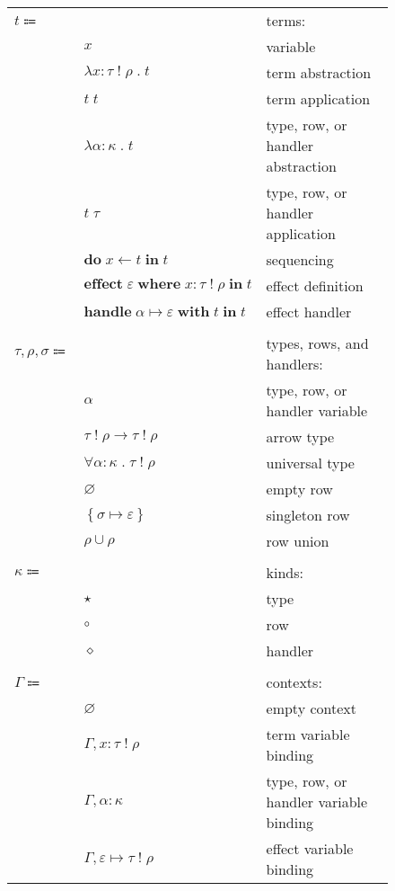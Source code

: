\documentclass[12pt]{article}
\newcommand\kAnno[2]{#1 : #2}
\newcommand\tAnno[3]{#1 : \tEmbellished{#2}{#3}}
\newcommand\xVar{\varepsilon}
\newcommand\hToX[2]{#1 \mapsto #2}
\newcommand\term{t}
\newcommand\eVar{x}
\newcommand\eAbs[4]{\lambda \tAnno{#1}{#2}{#3} \; . \; #4}
\newcommand\eApp[2]{#1 \; #2}
\newcommand\eTAbs[3]{\lambda \kAnno{#1}{#2} \; . \; #3}
\newcommand\eTApp[2]{#1 \; #2}
\newcommand\eDo[3]{\textbf{do} \; #1 \leftarrow #2 \; \textbf{in} \; #3}
\newcommand\eEffect[5]{\textbf{effect} \; #1 \; \textbf{where} \; \tAnno{#2}{#3}{#4} \; \textbf{in} \; #5}
\newcommand\eHandle[4]{\textbf{handle} \; \hToX{#1}{#2} \; \textbf{with} \; #3 \; \textbf{in} \; #4}
\newcommand\type{\tau}
\newcommand\tVar{\alpha}
\newcommand\tArrow[4]{\tEmbellished{#1}{#2} \rightarrow \tEmbellished{#3}{#4}}
\newcommand\tForAll[4]{\forall \kAnno{#1}{#2} \; . \; \tEmbellished{#3}{#4}}
\newcommand\row{\rho}
\newcommand\tEmbellished[2]{#1 \; ! \; #2}
\newcommand\tEmpty{\varnothing}
\newcommand\tSingleton[2]{\left\{ \hToX{#1}{#2} \right\}}
\newcommand\tUnion[2]{#1 \cup #2}
\newcommand\handler{\sigma}
\newcommand\kind{\kappa}
\newcommand\kType{\star}
\newcommand\kRow{\circ}
\newcommand\kHandler{\diamond}
\newcommand\context{\Gamma}
\newcommand\cEmpty{\varnothing}
\newcommand\cEExtend[4]{#1, \tAnno{#2}{#3}{#4}}
\newcommand\cTExtend[3]{#1, \kAnno{#2}{#3}}
\newcommand\cXExtend[4]{#1, #2 \mapsto \tEmbellished{#3}{#4}}
\begin{document}
      \begin{figure}[H]
        \begin{mdframed}[backgroundcolor=none]
          \begin{center}
            \begin{tabular}{l l l}
              $\term \Coloneqq$ & & terms: \\
              & $\eVar$ & variable \\
              & $\eAbs{\eVar}{\type}{\row}{\term}$ & term abstraction \\
              & $\eApp{\term}{\term}$ & term application \\
              & $\eTAbs{\tVar}{\kind}{\term}$ & type, row, or handler abstraction \\
              & $\eTApp{\term}{\type}$ & type, row, or handler application \\
              & $\eDo{\eVar}{\term}{\term}$ & sequencing \\
              & $\eEffect{\xVar}{\eVar}{\type}{\row}{\term}$ & effect definition \\
              & $\eHandle{\tVar}{\xVar}{\term}{\term}$ & effect handler \\
              \\
              $\type, \row, \handler \Coloneqq$ & & types, rows, and handlers: \\
              & $\tVar$ & type, row, or handler variable \\
              & $\tArrow{\type}{\row}{\type}{\row}$ & arrow type \\
              & $\tForAll{\tVar}{\kind}{\type}{\row}$ & universal type \\
              & $\tEmpty$ & empty row \\
              & $\tSingleton{\handler}{\xVar}$ & singleton row \\
              & $\tUnion{\row}{\row}$ & row union \\
              \\
              $\kind \Coloneqq$ & & kinds: \\
              & $\kType$ & type \\
              & $\kRow$ & row \\
              & $\kHandler$ & handler \\
              \\
              $\context \Coloneqq$ & & contexts: \\
              & $\cEmpty$ & empty context \\
              & $\cEExtend{\context}{\eVar}{\type}{\row}$ & term variable binding \\
              & $\cTExtend{\context}{\tVar}{\kind}$ & type, row, or handler variable binding \\
              & $\cXExtend{\context}{\xVar}{\type}{\row}$ & effect variable binding \\
            \end{tabular}
          \end{center}


\end{mdframed}
\end{figure}
\end{document}
